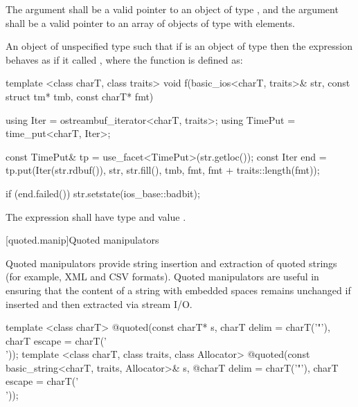 \begin{itemdescr}
\pnum
\requires The argument  shall be a valid pointer to an object of type
, and the argument  shall be a valid pointer to an
array of objects of type  with
 elements.

\pnum
\returns An object of unspecified type such that if  is an object of
type  then the expression  behaves as if it called , where the
function \tcode{f} is defined as:

\begin{codeblock}
template <class charT, class traits>
void f(basic_ios<charT, traits>& str, const struct tm* tmb, const charT* fmt) {
  using Iter    = ostreambuf_iterator<charT, traits>;
  using TimePut = time_put<charT, Iter>;

  const TimePut& tp = use_facet<TimePut>(str.getloc());
  const Iter end = tp.put(Iter(str.rdbuf()), str, str.fill(), tmb,
    fmt, fmt + traits::length(fmt));

  if (end.failed())
    str.setstate(ios_base::badbit);
}
\end{codeblock}

The expression  shall have type
\tcode{basic_ostream<charT, traits>\&} and value \tcode{out}.
\end{itemdescr}

[quoted.manip]{Quoted manipulators}

\pnum
\begin{note} Quoted manipulators provide string insertion and extraction of quoted strings (for example, XML and CSV formats). Quoted manipulators are useful in ensuring that the content of a string with embedded spaces remains unchanged if inserted and then extracted via stream I/O. \end{note}

%
\begin{itemdecl}
template <class charT>
  @\unspec@ quoted(const charT* s, charT delim = charT('"'), charT escape = charT('\\'));
template <class charT, class traits, class Allocator>
  @\unspec@ quoted(const basic_string<charT, traits, Allocator>& s,
  @\itcorr@                   charT delim = charT('"'), charT escape = charT('\\'));
\end{itemdecl}

